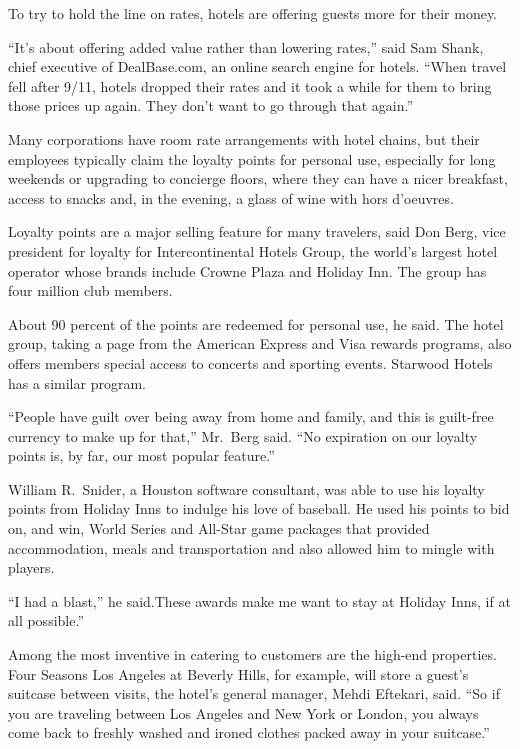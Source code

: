 ﻿\documentclass[12pt]{article}
\begin{document}
To try to hold the line on rates, hotels are offering guests more for their money.

``It's about offering added value rather than lowering rates,'' said Sam Shank, chief executive of
DealBase.com, an online search engine for hotels. ``When travel fell after 9/11, hotels dropped
their rates and it took a while for them to bring those prices up again. They don't want to go
through that again.''

Many corporations have room rate arrangements with hotel chains, but their employees typically claim
the loyalty points for personal use, especially for long weekends or upgrading to concierge floors,
where they can have a nicer breakfast, access to snacks and, in the evening, a glass of wine with
hors d'oeuvres.

Loyalty points are a major selling feature for many travelers, said Don Berg, vice president for
loyalty for Intercontinental Hotels Group, the world's largest hotel operator whose brands include
Crowne Plaza and Holiday Inn. The group has four million club members.

About 90 percent of the points are redeemed for personal use, he said. The hotel group, taking a
page from the American Express and Visa rewards programs, also offers members special access to
concerts and sporting events. Starwood Hotels has a similar program.

``People have guilt over being away from home and family, and this is guilt-free currency to make up
for that,'' Mr.~Berg said. ``No expiration on our loyalty points is, by far, our most popular
feature.''

William R.~Snider, a Houston software consultant, was able to use his loyalty points from Holiday
Inns to indulge\cite{indulge} his love of baseball. He used his points to bid on, and win, World
Series and All-Star game packages that provided accommodation, meals and transportation and also
allowed him to mingle with players.

``I had a blast,'' he said.These awards make me want to stay at Holiday Inns, if at all possible.''

Among the most inventive in catering to customers are the high-end properties. Four Seasons Los
Angeles at Beverly Hills, for example, will store a guest's suitcase between visits, the hotel's
general manager, Mehdi Eftekari, said. ``So if you are traveling between Los Angeles and New York or
London, you always come back to freshly washed and ironed clothes packed away in your suitcase.''
\end{document}

